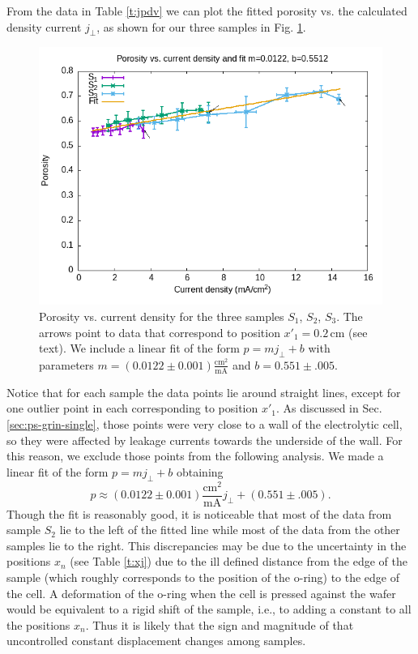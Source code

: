 \documentclass[review,sort&compress]{cas-sc}
\begin{document}
From the data in Table \ref{t:jpdv} we can plot the fitted porosity vs.
the calculated density current $j_\perp$, as shown for our three
samples in Fig. \ref{fig:p}.
\begin{figure}
  \centering
  \includegraphics[width=\textwidth]{fig11}
  \caption{Porosity vs. current density for the three samples
    $S_1$, $S_2$, $S_3$. The arrows point to data that correspond to
    position $x'_1=0.2\,\text{cm}$ (see text). We include a linear fit of the form
    $p=mj_\perp+b$ with parameters
    $m=(0.0122\pm0.001)\frac{\text{cm}^2}{\text{mA}}$ and
    $b=0.551\pm.005$.
    }
  \label{fig:p}
\end{figure}
Notice that for each sample the data points lie around straight lines,
except for one outlier point in each corresponding to position
$x'_1$. As discussed in Sec. \ref{sec:ps-grin-single}, those points
were very close to a wall of the electrolytic cell, so they were
affected by leakage currents towards the underside of the wall.
For this reason, we exclude those points from the following
analysis. We made a linear fit of the form $p=mj_\perp+b$ obtaining
\begin{equation}\label{eq:p}
  p\approx (0.0122\pm0.001)\frac{\text{cm}^2}{\text{mA}} j_\perp+(0.551\pm.005).
\end{equation}
Though the fit is reasonably good, it is noticeable that most of the data from
sample $S_2$ lie to the left of the fitted line while most of the data
from the other samples lie to the right. This discrepancies may be due
to the uncertainty in the positions $x_n$ (see Table \ref{t:xj}) due
to the ill defined distance from the edge of the sample (which roughly
corresponds to the position of the o-ring) to the edge of the cell. A
deformation of the o-ring when the cell is pressed against the wafer
would be equivalent to a rigid shift of the sample, i.e., to adding a
constant to all the positions $x_n$. Thus it is likely that the sign
and magnitude of that uncontrolled constant displacement changes among
samples.
\end{document}
